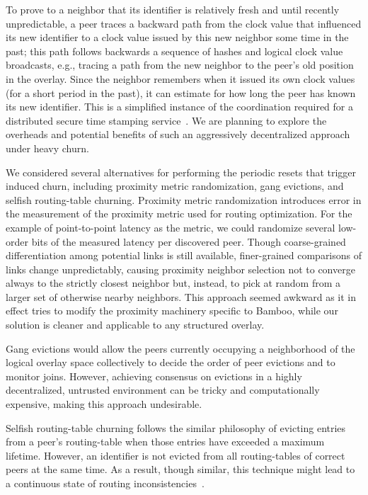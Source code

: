 \documentclass[10pt,twocolumn]{article}
\begin{document}
To prove to a neighbor that its identifier is relatively fresh and until
recently unpredictable, a peer traces a backward path from the clock
value that influenced its new identifier to a clock value issued by this
new neighbor some time in the past; this path follows backwards a
sequence of hashes and logical clock value broadcasts, e.g., tracing a
path from the new neighbor to the peer's old position in the overlay.
Since the neighbor remembers when it issued its own clock values (for a
short period in the past), it can estimate for how long the peer has
known its new identifier.  This is a simplified instance of the
coordination required for a distributed secure time stamping
service~\cite{Maniatis2002b}.  We are planning to explore the
overheads and potential benefits of such an aggressively decentralized
approach under heavy churn.


We considered several alternatives for performing the periodic resets 
that trigger induced churn, including proximity metric randomization, 
gang evictions, and selfish routing-table churning.  Proximity metric 
randomization introduces error in the
measurement of the proximity metric used for routing optimization.  For the
example of point-to-point latency as the metric, we could randomize
several low-order bits of the measured latency per discovered peer.
Though coarse-grained differentiation among potential links
is still available, finer-grained comparisons of links change
unpredictably, causing proximity neighbor selection not to
converge always to the strictly closest neighbor  but, instead, to pick
at random from a larger set of otherwise nearby neighbors.  This
approach seemed awkward as it in effect tries to modify the proximity machinery
specific to Bamboo, while our solution is cleaner and applicable to any structured overlay.

Gang evictions would allow the peers currently occupying a neighborhood of the
logical overlay space collectively to decide the order of peer evictions and to
monitor joins. However, achieving consensus on evictions in a highly
decentralized, untrusted environment can be tricky and computationally
expensive, making this approach undesirable.

Selfish routing-table churning follows the similar philosophy of evicting entries
from a peer's routing-table when those entries have exceeded a maximum
lifetime.  However, an identifier is not evicted from all routing-tables
of correct peers at the same time.  As a result, though similar, this
technique might lead to a continuous state of routing
inconsistencies~\cite{Liben2002short}.
\end{document}
